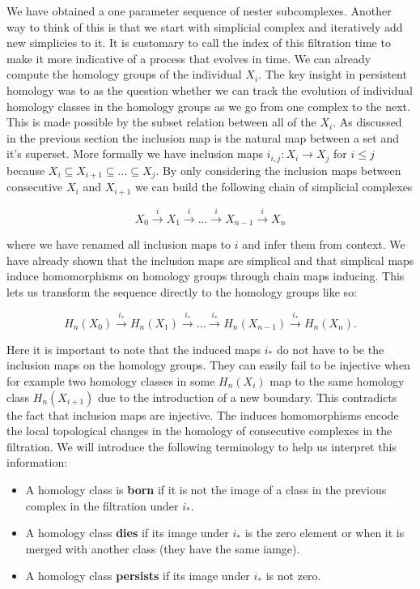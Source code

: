 We have obtained a one parameter sequence of nester subcomplexes. Another way to think of this is that we start with simplicial complex and iteratively add new simplicies to it. It is customary to call the index of this filtration time to make it more indicative of a process that evolves in time. We can already compute the homology groups of the individual $X_i$. The key insight in persistent homology was to as the question whether we can track the evolution of individual homology classes in the homology groups as we go from one complex to the next. This is made possible by the subset relation between all of the $X_i$. As discussed in the previous section the inclusion map is the natural map between a set and it's superset. More formally we have inclusion maps $i_{i, j}: X_i \to X_j$ for $i \le j$ because $X_i \subseteq X_{i+1} \subseteq ... \subseteq X_j$. 
By only considering the inclusion maps between consecutive $X_i$ and $X_{i+1}$ we can build the following chain of simplicial complexes


$$ X_0 \overset{i}{\longrightarrow} X_1 \overset{i}{\longrightarrow} ... \overset{i}{\longrightarrow} X_{n-1} \overset{i}{\longrightarrow} X_n$$


where we have renamed all inclusion maps to $i$ and infer them from context. We have already shown that the inclusion maps are simplical and that simplical maps induce homomorphisms on homology groups through chain maps inducing. This lets us transform the sequence directly to the homology groups like so:

$$ H_n(X_0) \overset{i_*}{\longrightarrow} H_n(X_1) \overset{i_*}{\longrightarrow} ... \overset{i_*}{\longrightarrow} H_n(X_{n-1}) \overset{i_*}{\longrightarrow} H_n(X_n).$$

Here it is important to note that the induced maps $i_*$ do not have to be the inclusion maps on the homology groups. They can easily fail to be injective when for example two homology classes in some $H_n(X_i)$ map to the same homology class $H_n(X_{i+1})$ due to the introduction of a new boundary. This contradicts the fact that inclusion maps are injective. The induces homomorphisms encode the local topological changes in the homology of consecutive complexes in the filtration. We will introduce the following terminology to help us interpret this information:


\begin{itemize}
    \item A homology class is \textbf{born} if it is not the image of a class in the previous complex in the filtration under $i_*$.
    \item A homology class \textbf{dies} if its image under $i_*$ is the zero element or when it is merged with another class (they have the same iamge).
    \item A homology class \textbf{persists} if its image under $i_*$ is not zero.
\end{itemize}

